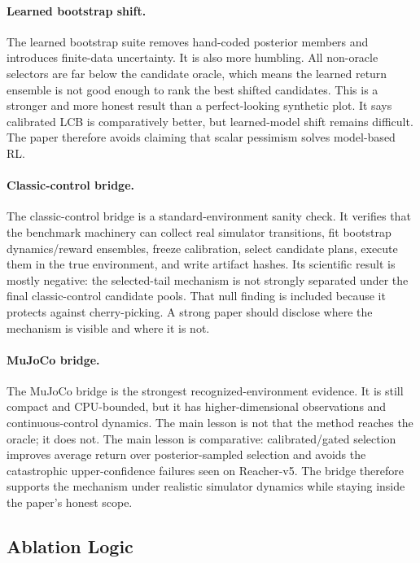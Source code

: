 \documentclass{article}
\begin{document}
\paragraph{Learned bootstrap shift.}
The learned bootstrap suite removes hand-coded posterior members and introduces
finite-data uncertainty. It is also more humbling. All non-oracle selectors are
far below the candidate oracle, which means the learned return ensemble is not
good enough to rank the best shifted candidates. This is a stronger and more
honest result than a perfect-looking synthetic plot. It says calibrated LCB is
comparatively better, but learned-model shift remains difficult. The paper
therefore avoids claiming that scalar pessimism solves model-based RL.

\paragraph{Classic-control bridge.}
The classic-control bridge is a standard-environment sanity check. It verifies
that the benchmark machinery can collect real simulator transitions, fit
bootstrap dynamics/reward ensembles, freeze calibration, select candidate
plans, execute them in the true environment, and write artifact hashes. Its
scientific result is mostly negative: the selected-tail mechanism is not
strongly separated under the final classic-control candidate pools. That null
finding is included because it protects against cherry-picking. A strong paper
should disclose where the mechanism is visible and where it is not.

\paragraph{MuJoCo bridge.}
The MuJoCo bridge is the strongest recognized-environment evidence. It is still
compact and CPU-bounded, but it has higher-dimensional observations and
continuous-control dynamics. The main lesson is not that the method reaches the
oracle; it does not. The main lesson is comparative: calibrated/gated
selection improves average return over posterior-sampled selection and avoids
the catastrophic upper-confidence failures seen on Reacher-v5. The bridge
therefore supports the mechanism under realistic simulator dynamics while
staying inside the paper's honest scope.

\subsection{Ablation Logic}
\end{document}

